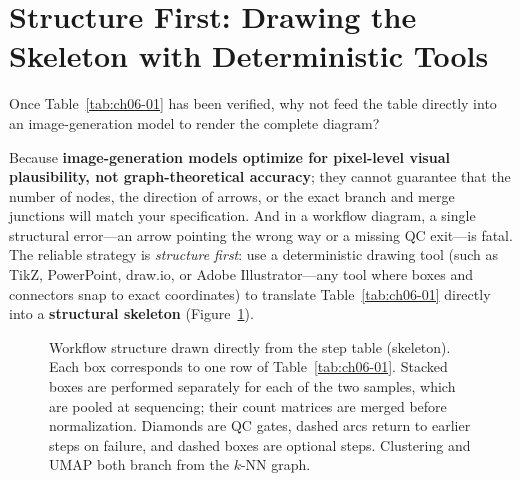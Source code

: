 \section{Structure First: Drawing the Skeleton with Deterministic Tools}

Once Table~\ref{tab:ch06-01} has been verified, why not feed the table directly into an image-generation model to render the complete diagram?

Because \textbf{image-generation models optimize for pixel-level visual plausibility, not graph-theoretical accuracy}; they cannot guarantee that the number of nodes, the direction of arrows, or the exact branch and merge junctions will match your specification. And in a workflow diagram, a single structural error—an arrow pointing the wrong way or a missing QC exit—is fatal. The reliable strategy is \emph{structure first}: use a deterministic drawing tool (such as TikZ, PowerPoint, draw.io, or Adobe Illustrator—any tool where boxes and connectors snap to exact coordinates) to translate Table~\ref{tab:ch06-01} directly into a \textbf{structural skeleton} (Figure~\ref{fig:ch06-03}).

\begin{figure}[htbp]\centering
\resizebox{\linewidth}{!}{}
\caption{Workflow structure drawn directly from the step table (skeleton). Each box corresponds to one row of Table~\ref{tab:ch06-01}. Stacked boxes are performed separately for each of the two samples, which are pooled at sequencing; their count matrices are merged before normalization. Diamonds are QC gates, dashed arcs return to earlier steps on failure, and dashed boxes are optional steps. Clustering and UMAP both branch from the $k$-NN graph.}\label{fig:ch06-03}
\end{figure}

